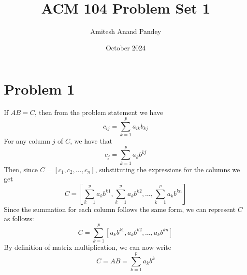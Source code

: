 \documentclass{article}
\title{ACM 104 Problem Set 1}
\author{Amitesh Anand Pandey}
\date{October 2024}
\begin{document}
\maketitle
\section*{Problem 1}
If $AB = C$, then from the problem statement we have
\begin{equation*}
    c_{ij} = \sum_{k = 1}^{p} a_{ik}b_{kj}
\end{equation*}
For any column $j$ of $C$, we have that
\begin{equation*}
    c_{j} = \sum_{k = 1}^{p}a_{k}b^{kj}
\end{equation*}
Then, since $C = [c_{1}, c_{2}, \dots, c_{n}]$, substituting the expressions for the columns we get
\begin{equation*}
    C = \left[\sum_{k = 1}^{p}a_{k}b^{k1}, \sum_{k = 1}^{p}a_{k}b^{k2}, \dots, \sum_{k = 1}^{p}a_{k}b^{kn}\right]
\end{equation*}
Since the summation for each column follows the same form, we can represent $C$ as follows:
\begin{equation*}
    C = \sum_{k = 1}^{p} \left[a_{k}b^{k1}, a_{k}b^{k2}, \dots , a_{k}b^{kn}\right]
\end{equation*}
By definition of matrix multiplication, we can now write
\begin{equation*}
    C = AB = \sum_{k=1}^{p}a_{k}b^{k}
\end{equation*}
\newpage
\end{document}
